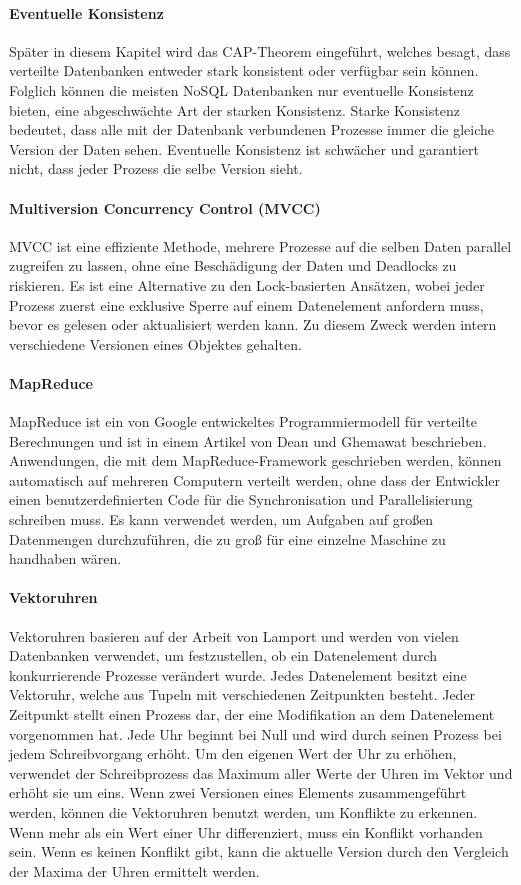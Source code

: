 \paragraph{Eventuelle Konsistenz} Später in diesem Kapitel wird das CAP-Theorem eingeführt, welches besagt, dass verteilte Datenbanken entweder stark konsistent oder verfügbar sein können. Folglich können die meisten NoSQL Datenbanken nur eventuelle Konsistenz bieten, eine abgeschwächte Art der starken Konsistenz. Starke Konsistenz bedeutet, dass alle mit der Datenbank verbundenen Prozesse immer die gleiche Version der Daten sehen. Eventuelle Konsistenz ist schwächer und garantiert nicht, dass jeder Prozess die selbe Version sieht.

\paragraph{Multiversion Concurrency Control (MVCC)} MVCC ist eine effiziente Methode, mehrere Prozesse auf die selben Daten parallel zugreifen zu lassen, ohne eine Beschädigung der Daten und Deadlocks zu riskieren. Es ist eine Alternative zu den Lock-basierten Ansätzen, wobei jeder Prozess zuerst eine exklusive Sperre auf einem Datenelement anfordern muss, bevor es gelesen oder aktualisiert werden kann. Zu diesem Zweck werden intern verschiedene Versionen eines Objektes gehalten.

\paragraph{MapReduce} MapReduce ist ein von Google entwickeltes Programmiermodell für verteilte Berechnungen und ist in einem Artikel von Dean und Ghemawat \cite{Dean:2008:MSD:1327452.1327492} beschrieben. Anwendungen, die mit dem MapReduce-Framework geschrieben werden, können automatisch auf mehreren Computern verteilt werden, ohne dass der Entwickler einen benutzerdefinierten Code für die Synchronisation und Parallelisierung schreiben muss. Es kann verwendet werden, um Aufgaben auf großen Datenmengen durchzuführen, die zu groß für eine einzelne Maschine zu handhaben wären.

\paragraph{Vektoruhren}
Vektoruhren  basieren auf der Arbeit von Lamport \cite{Lamport:1978:TCO:359545.359563} und werden von vielen Datenbanken verwendet, um festzustellen, ob ein Datenelement durch konkurrierende Prozesse verändert wurde. Jedes Datenelement besitzt eine Vektoruhr, welche aus Tupeln mit verschiedenen Zeitpunkten besteht. Jeder Zeitpunkt stellt einen Prozess dar, der eine Modifikation an dem Datenelement vorgenommen hat. Jede Uhr beginnt bei Null und wird durch seinen Prozess bei jedem Schreibvorgang erhöht. Um den eigenen Wert der Uhr zu erhöhen, verwendet der Schreibprozess das Maximum aller Werte der Uhren im Vektor und erhöht sie um eins. Wenn zwei Versionen eines Elements zusammengeführt werden, können die Vektoruhren benutzt werden, um Konflikte zu erkennen. Wenn mehr als ein Wert einer Uhr differenziert, muss ein Konflikt vorhanden sein. Wenn es keinen Konflikt gibt, kann die aktuelle Version durch den Vergleich der Maxima der Uhren ermittelt werden.

